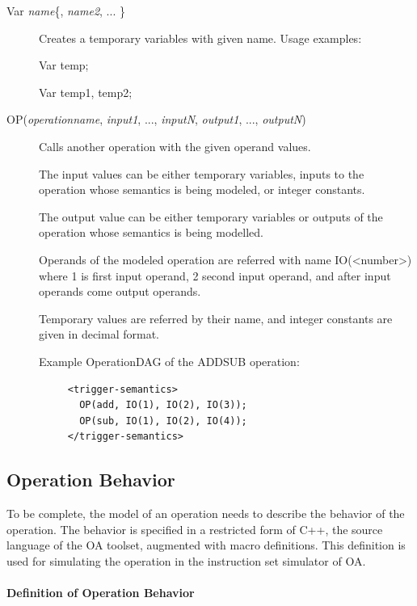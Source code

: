 \documentclass[a4paper,twoside]{tceusermanual}
\begin{document}
\begin{description}

\item[Var \emph{name}\{, \emph{name2}, ... \}] %
  Creates a temporary variables with given name. Usage examples:

  Var temp;

  Var temp1, temp2;

\item[OP(\emph{operationname}, \emph{input1}, ..., \emph{inputN}, \emph{output1}, ..., \emph{outputN})] 
 Calls another operation with the given operand values. 

The input values can be either temporary variables, inputs to the operation
whose semantics is being modeled, or integer constants.

The output value can be either temporary variables or outputs of the operation
whose semantics is being modelled.

Operands of the modeled operation are referred with name IO(<number>) 
where 1 is first input operand, 2 second input operand, and after input 
operands come output operands. 

Temporary values are referred by their name, and integer constants are given
in decimal format.

Example OperationDAG of the ADDSUB operation:

\begin{verbatim}
     <trigger-semantics>
       OP(add, IO(1), IO(2), IO(3));
       OP(sub, IO(1), IO(2), IO(4));
     </trigger-semantics>
\end{verbatim}


\end{description}


\subsection{Operation Behavior}
\label{ssec:operation-behavior}

To be complete, the model of an operation needs to describe the
behavior of the operation. The behavior is specified in a restricted
form of C++, the source language of the OA toolset, augmented with
macro definitions.  This definition is used for simulating the
operation in the instruction set simulator of OA.

\paragraph{Definition of Operation Behavior}
\end{document}
